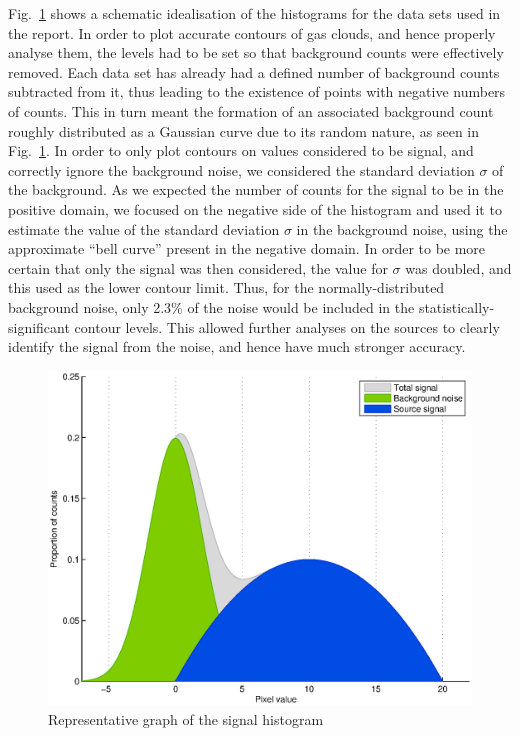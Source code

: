 \documentclass[a4paper, titlepage, oneside]{article}
\begin{document}
\begin{multicols}{2}
Fig.~\ref{fig:noise} shows a schematic idealisation of the histograms for the data sets used in the report. In order to plot accurate contours of gas clouds, and hence properly analyse them, the levels had to be set so that background counts were effectively removed. Each data set has already had a defined number of background counts subtracted from it, thus leading to the existence of points with negative numbers of counts. This in turn meant the formation of an associated background count roughly distributed as a Gaussian curve due to its random nature, as seen in Fig.~\ref{fig:noise}. In order to only plot contours on values considered to be signal, and correctly ignore the background noise, we considered the standard deviation \(\sigma\) of the background. As we expected the number of counts for the signal to be in the positive domain, we focused on the negative side of the histogram and used it to estimate the value of the standard deviation \(\sigma\) in the background noise, using the approximate ``bell curve'' present in the negative domain. In order to be more certain that only the signal was then considered, the value for \(\sigma\) was doubled, and this used as the lower contour limit. Thus, for the normally-distributed background noise, only 2.3\% of the noise would be included in the statistically-significant contour levels. This allowed further analyses on the sources to clearly identify the signal from the noise, and hence have much stronger accuracy.

\begin{figure}[H]
  \centering
  \includegraphics[width = \columnwidth]{figures/noise-analysis}
  \caption{Representative graph of the signal histogram}
  \label{fig:noise}
\end{figure}


\end{multicols}
\end{document}
